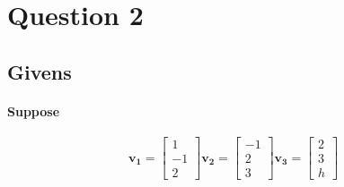 \documentclass{article}
\begin{document}
    \section{Question 2}
        \subsection{Givens}
            \paragraph{Suppose}
                \[
                \mathbf{v_1}=\begin{bmatrix}1\\-1\\2\end{bmatrix}
                \mathbf{v_2}=\begin{bmatrix}-1\\2\\3\end{bmatrix}
                \mathbf{v_3}=\begin{bmatrix}2\\3\\h\end{bmatrix}
                \]
\end{document}
